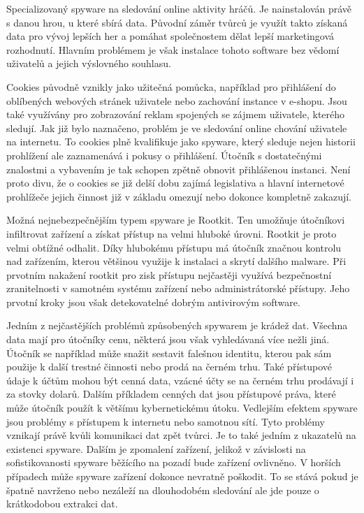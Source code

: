 Specializovaný spyware na sledování online aktivity hráčů.
Je nainstalován právě s danou hrou, u které sbírá data.
Původní záměr tvůrců je využít takto získaná data pro vývoj lepších her a pomáhat společnostem dělat lepší marketingová rozhodnutí.
Hlavním problémem je však instalace tohoto software bez vědomí uživatelů a jejich výslovného souhlasu.\cite{avast_spyware}

Cookies původně vznikly jako užitečná pomůcka, například pro přihlášení do oblíbených webových stránek uživatele nebo zachování instance v e-shopu.
Jsou také využívány pro zobrazování reklam spojených se zájmem uživatele, kterého sledují.
Jak již bylo naznačeno, problém je ve sledování online chování uživatele na internetu.
To cookies plně kvalifikuje jako spyware, který sleduje nejen historii prohlížení ale zaznamenává i pokusy o přihlášení.
Útočník s dostatečnými znalostmi a vybavením je tak schopen zpětně obnovit přihlášenou instanci.
Není proto divu, že o cookies se již delší dobu zajímá legislativa a hlavní internetové prohlížeče jejich činnost již v základu omezují nebo dokonce kompletně zakazují.\cite{avast_spyware}

Možná nejnebezpečnějším typem spyware je Rootkit.
Ten umožňuje útočníkovi infiltrovat zařízení a získat přístup na velmi hluboké úrovni.
Rootkit je proto velmi obtížné odhalit.
Díky hlubokému přístupu má útočník značnou kontrolu nad zařízením, kterou většinou využije k instalaci a skrytí dalšího malware.
Při prvotním nakažení rootkit pro zisk přístupu nejčastěji využívá bezpečnostní zranitelnosti v samotném systému zařízení nebo administrátorské přístupy.
Jeho prvotní kroky jsou však detekovatelné dobrým antivirovým software.\cite{avast_spyware}

Jedním z nejčastějších problémů způsobených spywarem je krádež dat.
Všechna data mají pro útočníky cenu, některá jsou však vyhledávaná více nežli jiná.
Útočník se například může snažit sestavit falešnou identitu, kterou pak sám použije k další trestné činnosti nebo prodá na černém trhu.
Také přístupové údaje k účtům mohou být cenná data, vzácné účty se na černém trhu prodávají i za stovky dolarů.
Dalším příkladem cenných dat jsou přístupové práva, které může útočník použít k většímu kybernetickému útoku.
Vedlejším efektem spyware jsou problémy s přístupem k internetu nebo samotnou sítí.
Tyto problémy vznikají právě kvůli komunikaci dat zpět tvůrci.
Je to také jedním z ukazatelů na existenci spyware.
Dalším je zpomalení zařízení, jelikož v závislosti na sofistikovanosti spyware běžícího na pozadí bude zařízení ovlivněno.
V horších případech může spyware zařízení dokonce nevratně poškodit.
To se stává pokud je špatně navrženo nebo nezáleží na dlouhodobém sledování ale jde pouze o krátkodobou extrakci dat.\cite{avast_spyware, fortinet_spyware}

